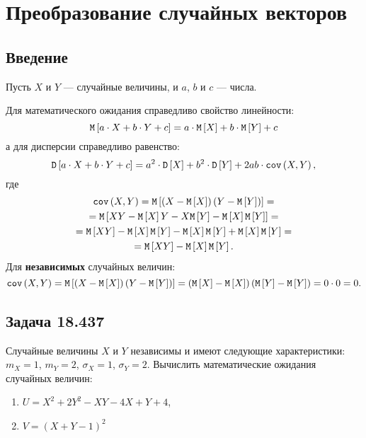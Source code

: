 \chapter{Преобразование случайных векторов}


\section*{Введение}
Пусть $X$ и $Y$ --- случайные величины, и $a$, $b$ и $c$ --- числа.

Для математического ожидания справедливо свойство линейности:
\begin{equation}
    \mathtt{M} \left [ a \cdot X + b \cdot Y + c \right ]
    = a \cdot \mathtt{M} \left [ X \right ] + b \cdot \mathtt{M} \left [ Y \right ] + c
\end{equation}
а для дисперсии справедливо равенство:
\begin{equation}
    \mathtt{D} \left [ a \cdot X + b \cdot Y + c \right ]
    = a^2 \cdot \mathtt{D} \left [ X \right ] + b^2 \cdot \mathtt{D} \left [ Y \right ] + 2 a b \cdot \texttt{cov} \left ( X , Y \right ),
\end{equation}
где
\begin{multline}
    \label{10:covariance}
    \texttt{cov} \left ( X , Y \right )
    = \mathtt{M} \left [ \left ( X - \mathtt{M} \left [ X \right ] \right ) \left ( Y - \mathtt{M} \left [ Y \right ] \right ) \right ] = \\
    = \mathtt{M} \left [  X Y - \mathtt{M} \left [ X \right ] Y - X \mathtt{M} \left [ Y \right ] - \mathtt{M} \left [ X \right ] \mathtt{M} \left [ Y \right ] \right ] = \\
    = \mathtt{M} \left [ XY \right ] - \mathtt{M} \left [ X \right ] \mathtt{M} \left [ Y \right ] - \mathtt{M} \left [ X \right ] \mathtt{M} \left [ Y \right ] + \mathtt{M} \left [ X \right ] \mathtt{M} \left [ Y \right ] = \\
    = \mathtt{M} \left [ XY \right ] - \mathtt{M} \left [ X \right ] \mathtt{M} \left [ Y \right ].
\end{multline}
Для \textbf{независимых} случайных величин:
\begin{equation}
    \texttt{cov} \left ( X , Y \right )
    = \mathtt{M} \left [ \left ( X - \mathtt{M} \left [ X \right ] \right ) \left ( Y - \mathtt{M} \left [ Y \right ] \right ) \right ]
    = \left ( \mathtt{M} \left [ X \right ] - \mathtt{M} \left [ X \right ] \right ) \left ( \mathtt{M} \left [ Y \right ] - \mathtt{M} \left [ Y \right ] \right )
    = 0 \cdot 0
    = 0 .
\end{equation}


\section*{Задача 18.437}

Случайные величины $X$ и $Y$ независимы и имеют следующие характеристики: $m_X = 1$, $m_Y = 2$, $\sigma_X = 1$, $\sigma_Y = 2$.
Вычислить математические ожидания случайных величин:
\begin{enumerate}
    \item $U = X^2 + 2 Y^2 - XY - 4X + Y + 4$,
    \item $V = (X + Y - 1)^2$
\end{enumerate}

